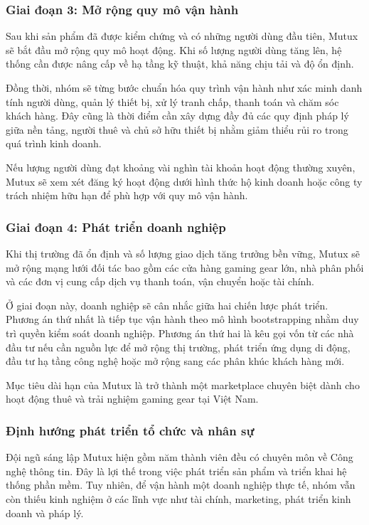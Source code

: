 \subsubsection{Giai đoạn 3: Mở rộng quy mô vận hành}
Sau khi sản phẩm đã được kiểm chứng và có những người dùng đầu tiên, Mutux sẽ bắt đầu mở rộng quy mô hoạt động. Khi số lượng người dùng tăng lên, hệ thống cần được nâng cấp về hạ tầng kỹ thuật, khả năng chịu tải và độ ổn định.

Đồng thời, nhóm sẽ từng bước chuẩn hóa quy trình vận hành như xác minh danh tính người dùng, quản lý thiết bị, xử lý tranh chấp, thanh toán và chăm sóc khách hàng. Đây cũng là thời điểm cần xây dựng đầy đủ các quy định pháp lý giữa nền tảng, người thuê và chủ sở hữu thiết bị nhằm giảm thiểu rủi ro trong quá trình kinh doanh.

Nếu lượng người dùng đạt khoảng vài nghìn tài khoản hoạt động thường xuyên, Mutux sẽ xem xét đăng ký hoạt động dưới hình thức hộ kinh doanh hoặc công ty trách nhiệm hữu hạn để phù hợp với quy mô vận hành.

\subsubsection{Giai đoạn 4: Phát triển doanh nghiệp}
Khi thị trường đã ổn định và số lượng giao dịch tăng trưởng bền vững, Mutux sẽ mở rộng mạng lưới đối tác bao gồm các cửa hàng gaming gear lớn, nhà phân phối và các đơn vị cung cấp dịch vụ thanh toán, vận chuyển hoặc tài chính.

Ở giai đoạn này, doanh nghiệp sẽ cân nhắc giữa hai chiến lược phát triển. Phương án thứ nhất là tiếp tục vận hành theo mô hình bootstrapping nhằm duy trì quyền kiểm soát doanh nghiệp. Phương án thứ hai là kêu gọi vốn từ các nhà đầu tư nếu cần nguồn lực để mở rộng thị trường, phát triển ứng dụng di động, đầu tư hạ tầng công nghệ hoặc mở rộng sang các phân khúc khách hàng mới.

Mục tiêu dài hạn của Mutux là trở thành một marketplace chuyên biệt dành cho hoạt động thuê và trải nghiệm gaming gear tại Việt Nam.

\subsubsection{Định hướng phát triển tổ chức và nhân sự}
Đội ngũ sáng lập Mutux hiện gồm năm thành viên đều có chuyên môn về Công nghệ thông tin. Đây là lợi thế trong việc phát triển sản phẩm và triển khai hệ thống phần mềm. Tuy nhiên, để vận hành một doanh nghiệp thực tế, nhóm vẫn còn thiếu kinh nghiệm ở các lĩnh vực như tài chính, marketing, phát triển kinh doanh và pháp lý.

